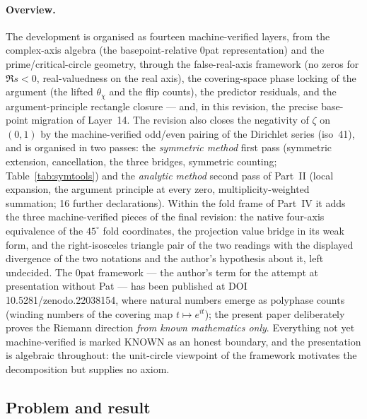 \documentclass{article}
\newcommand{\zt}{\zeta}
\newcommand{\Xchi}{\chi}
\begin{document}
\paragraph{Overview.} The development is organised as fourteen
machine-verified layers, from the complex-axis algebra (the
basepoint-relative 0pat representation) and the prime/critical-circle
geometry, through the false-real-axis framework (no zeros for
$\Re s<0$, real-valuedness on the real axis), the covering-space phase
locking of the argument (the lifted $\theta_\Xchi$ and the flip
counts), the predictor residuals, and the argument-principle rectangle
closure --- and, in this revision, the precise base-point migration
of Layer~14. The revision also closes the negativity of $\zt$ on
$(0,1)$ by the machine-verified odd/even pairing of the Dirichlet
series (iso~41), and is organised in two passes: the \emph{symmetric
method} first pass (symmetric extension, cancellation, the three
bridges, symmetric counting; Table~\ref{tab:symtools}) and the
\emph{analytic method} second pass of Part~II (local expansion, the
argument principle at every zero, multiplicity-weighted summation; 16
further declarations). Within the fold frame of Part~IV it adds the
three machine-verified pieces of the final revision: the native
four-axis equivalence of the $45^\circ$ fold coordinates, the
projection value bridge in its weak form, and the right-isosceles
triangle pair of the two readings with the displayed divergence of the
two notations and the author's hypothesis about it, left undecided.
The 0pat framework --- the author's term for the attempt at
presentation without Pat --- has been published at DOI
10.5281/zenodo.22038154, where natural numbers emerge as polyphase
counts (winding numbers of the covering map $t\mapsto e^{it}$); the
present paper deliberately proves the Riemann direction \emph{from
known mathematics only}. Everything not yet machine-verified is marked
KNOWN as an honest boundary, and the presentation is algebraic
throughout: the unit-circle viewpoint of the framework motivates the
decomposition but supplies no axiom.

\subsection{Problem and result}
\label{sec:problem}
\end{document}

